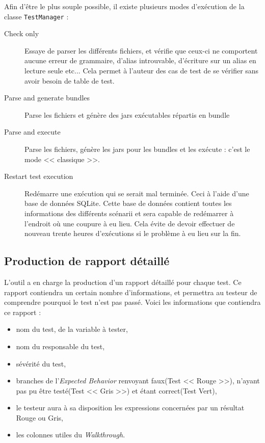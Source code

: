 Afin d'être le plus souple possible, il existe plusieurs modes d'exécution de la classe \texttt{TestManager} : 
\begin{description}
	\item[Check only] Essaye de parser les différents fichiers, et vérifie que ceux-ci ne comportent aucune erreur de grammaire, d'alias introuvable, d'écriture sur un alias en lecture seule etc... Cela permet à l'auteur des cas de test de se vérifier sans avoir besoin de table de test.
	\item[Parse and generate bundles] Parse les fichiers et génère des jars exécutables répartis en bundle
	\item[Parse and execute] Parse les fichiers, génère les jars pour les bundles et les exécute : c'est le mode << classique >>.
	\item[Restart test execution] Redémarre une exécution qui se serait mal terminée. Ceci à l'aide d'une base de données SQLite. Cette base de données contient toutes les informations des différents scénarii et sera capable de redémarrer à l'endroit où une coupure à eu lieu. Cela évite de devoir effectuer de nouveau trente heures d'exécutions si le problème à eu lieu sur la fin.
\end{description}

\subsection{Production de rapport détaillé}\label{report}
L'outil a en charge la production d'un rapport détaillé pour chaque test. Ce rapport contiendra un certain nombre d'informations, et permettra au testeur de comprendre pourquoi le test n'est pas passé. Voici les informations que contiendra ce rapport : 

\begin{itemize}
	\item nom du test, de la variable à tester,
	\item nom du responsable du test,
	\item sévérité du test,
	\item branches de l'\textit{Expected Behavior} renvoyant faux(Test << Rouge >>), n'ayant pas pu être testé(Test << Gris >>) et étant correct(Test Vert),
	\item le testeur aura à sa disposition les expressions concernées par un résultat Rouge ou Gris,
	\item les colonnes utiles du \textit{Walkthrough}.
\end{itemize}

